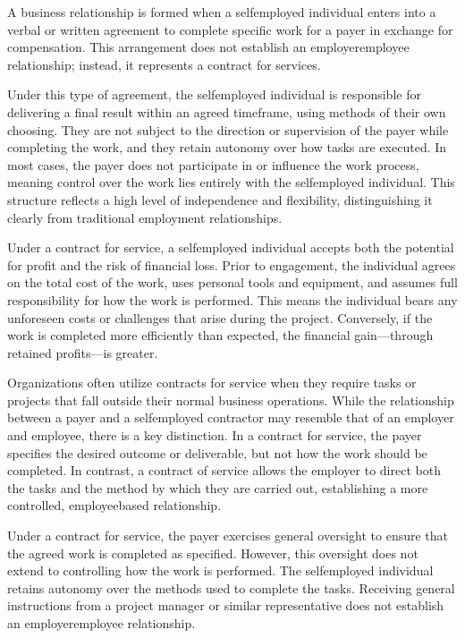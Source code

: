 \documentclass[letterpaper,10pt,english]{sphinxmanual}
\begin{document}
\sphinxAtStartPar
A business relationship is formed when a self\sphinxhyphen{}employed individual enters into a verbal or written agreement to complete
specific work for a payer in exchange for compensation. This arrangement does not establish an employer\sphinxhyphen{}employee relationship;
instead, it represents a contract for services.

\sphinxAtStartPar
Under this type of agreement, the self\sphinxhyphen{}employed individual is responsible for delivering a final result within an agreed
timeframe, using methods of their own choosing. They are not subject to the direction or supervision of the payer while
completing the work, and they retain autonomy over how tasks are executed. In most cases, the payer does not participate in
or influence the work process, meaning control over the work lies entirely with the self\sphinxhyphen{}employed individual. This structure
reflects a high level of independence and flexibility, distinguishing it clearly from traditional employment relationships.

\sphinxAtStartPar
Under a contract for service, a self\sphinxhyphen{}employed individual accepts both the potential for profit and the risk of financial loss.
Prior to engagement, the individual agrees on the total cost of the work, uses personal tools and equipment, and assumes full
responsibility for how the work is performed. This means the individual bears any unforeseen costs or challenges that arise
during the project. Conversely, if the work is completed more efficiently than expected, the financial gain—through retained
profits—is greater.

\sphinxAtStartPar
Organizations often utilize contracts for service when they require tasks or projects that fall outside their normal business
operations. While the relationship between a payer and a self\sphinxhyphen{}employed contractor may resemble that of an employer and
employee, there is a key distinction. In a contract for service, the payer specifies the desired outcome or deliverable, but
not how the work should be completed. In contrast, a contract of service allows the employer to direct both the tasks and the
method by which they are carried out, establishing a more controlled, employee\sphinxhyphen{}based relationship.

\sphinxAtStartPar
Under a contract for service, the payer exercises general oversight to ensure that the agreed work is completed as specified.
However, this oversight does not extend to controlling how the work is performed. The self\sphinxhyphen{}employed individual retains
autonomy over the methods used to complete the tasks. Receiving general instructions from a project manager or similar
representative does not establish an employer\sphinxhyphen{}employee relationship.
\end{document}

